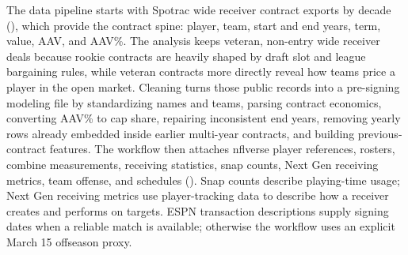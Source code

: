 \documentclass[
  10pt,
]{article}
\begin{document}
The data pipeline starts with Spotrac wide receiver contract exports by decade (), which provide the contract spine: player, team, start and end years, term, value, AAV, and AAV\%. The analysis keeps veteran, non-entry wide receiver deals because rookie contracts are heavily shaped by draft slot and league bargaining rules, while veteran contracts more directly reveal how teams price a player in the open market. Cleaning turns those public records into a pre-signing modeling file by standardizing names and teams, parsing contract economics, converting AAV\% to cap share, repairing inconsistent end years, removing yearly rows already embedded inside earlier multi-year contracts, and building previous-contract features. The workflow then attaches nflverse player references, rosters, combine measurements, receiving statistics, snap counts, Next Gen receiving metrics, team offense, and schedules (). Snap counts describe playing-time usage; Next Gen receiving metrics use player-tracking data to describe how a receiver creates and performs on targets. ESPN transaction descriptions supply signing dates when a reliable match is available; otherwise the workflow uses an explicit March 15 offseason proxy.

\begin{table}[H]
\centering
\caption{\label{tab:main-split-table}\label{tab:main-splits} Modeling files and their roles in the analysis.}
\centering
{}
\end{table}
\end{document}
